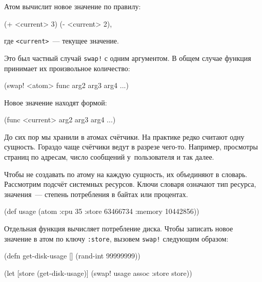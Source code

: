 Атом вычислит новое значение по правилу:

\begin{english}
  \begin{clojure}
(+ <current> 3)
(- <current> 2),
  \end{clojure}
\end{english}

\noindent
где \verb|<current>|~--- текущее значение.

Это был частный случай \verb|swap!| с одним аргументом. В общем случае функция
принимает их произвольное количество:

\begin{english}
  \begin{clojure}
(swap! <atom> func arg2 arg3 arg4 ...)
  \end{clojure}
\end{english}

\noindent
Новое значение находят формой:

\begin{english}
  \begin{clojure}
(func <current> arg2 arg3 arg4 ...)
  \end{clojure}
\end{english}

До сих пор мы хранили в атомах счётчики. На практике редко считают одну
сущность. Гораздо чаще счётчики ведут в разрезе чего-то. Например, просмотры
страниц по адресам, число сообщений у~пользователя и так далее.

Чтобы не создавать по атому на каждую сущность, их объединяют в
словарь. Рассмотрим подсчёт системных ресурсов. Ключи словаря означают тип
ресурса, значения~--- степень потребления в байтах или процентах.

\begin{english}
  \begin{clojure}
(def usage
  (atom {:cpu 35
         :store 63466734
         :memory 10442856}))
  \end{clojure}
\end{english}

Отдельная функция вычисляет потребление диска. Чтобы записать новое значение в
атом по ключу \verb|:store|, вызовем \verb|swap!| следующим образом:

\begin{english}
  \begin{clojure}
(defn get-disk-usage []
  (rand-int 99999999))

(let [store (get-disk-usage)]
  (swap! usage assoc :store store))
  \end{clojure}
\end{english}

